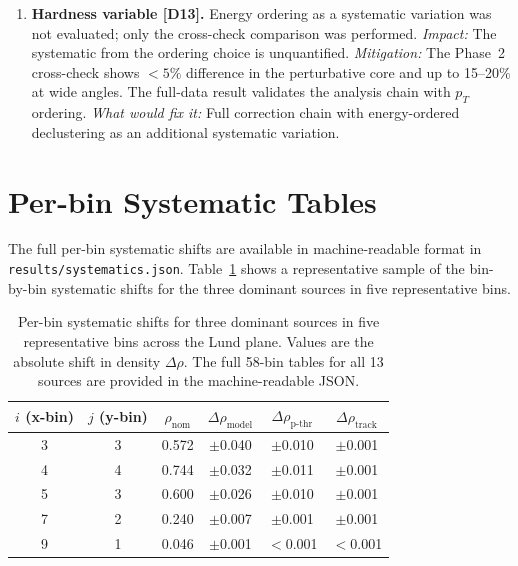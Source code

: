 \documentclass[11pt,a4paper]{article}
\begin{document}
\begin{enumerate}
\item \textbf{Hardness variable [D13].}  Energy ordering as a
  systematic variation was not evaluated; only the cross-check
  comparison was performed.  \emph{Impact:} The systematic from the
  ordering choice is unquantified.  \emph{Mitigation:} The Phase~2
  cross-check shows $<\!5\%$ difference in the perturbative core and
  up to 15--20\% at wide angles.  The full-data result validates the
  analysis chain with $p_T$ ordering.
  \emph{What would fix it:} Full correction chain with energy-ordered
  declustering as an additional systematic variation.
\end{enumerate}

\clearpage


\clearpage
\appendix

\section{Per-bin Systematic Tables}
\label{app:syst-tables}

The full per-bin systematic shifts are available in machine-readable
format in \texttt{results/systematics.json}.
Table~\ref{tbl:syst-perbin-sample} shows a representative sample of
the bin-by-bin systematic shifts for the three dominant sources in
five representative bins.

\begin{table}[htbp]
\centering
\caption{Per-bin systematic shifts for three dominant sources in five
  representative bins across the Lund plane.  Values are the absolute
  shift in density $\Delta\rho$.  The full 58-bin tables for all 13
  sources are provided in the machine-readable JSON.}
\label{tbl:syst-perbin-sample}
\begin{tabular}{cccccc}
\toprule
$i$ (x-bin) & $j$ (y-bin) & $\rho_\text{nom}$ &
  $\Delta\rho_\text{model}$ & $\Delta\rho_\text{p-thr}$ &
  $\Delta\rho_\text{track}$ \\
\midrule
3 & 3 & 0.572 & $\pm$0.040 & $\pm$0.010 & $\pm$0.001 \\
4 & 4 & 0.744 & $\pm$0.032 & $\pm$0.011 & $\pm$0.001 \\
5 & 3 & 0.600 & $\pm$0.026 & $\pm$0.010 & $\pm$0.001 \\
7 & 2 & 0.240 & $\pm$0.007 & $\pm$0.001 & $\pm$0.001 \\
9 & 1 & 0.046 & $\pm$0.001 & $<$0.001 & $<$0.001 \\
\bottomrule
\end{tabular}
\end{table}
\end{document}
